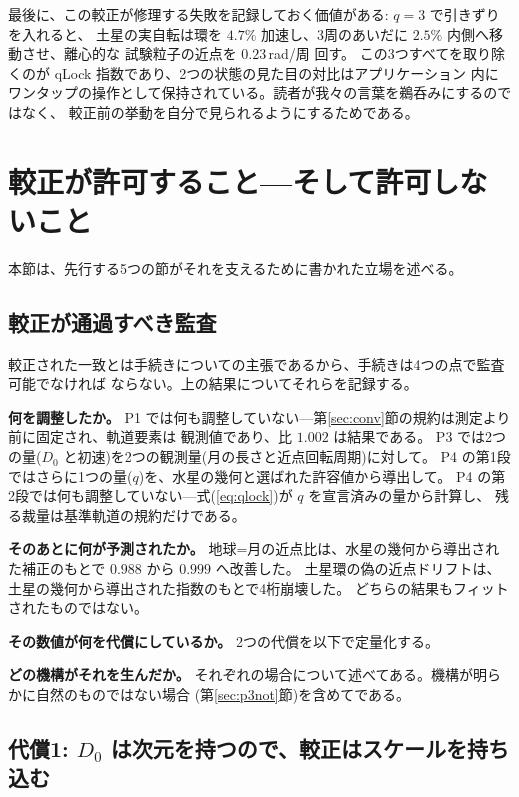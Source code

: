 \documentclass[a4paper,10pt,twocolumn]{ltjsarticle}
\begin{document}
最後に、この較正が修理する失敗を記録しておく価値がある: $q=3$ で引きずりを入れると、
土星の実自転は環を $4.7\%$ 加速し、3周のあいだに $2.5\%$ 内側へ移動させ、離心的な
試験粒子の近点を $0.23$\,rad/周 回す。
この3つすべてを取り除くのが qLock 指数であり、2つの状態の見た目の対比はアプリケーション
内にワンタップの操作として保持されている。読者が我々の言葉を鵜呑みにするのではなく、
較正前の挙動を自分で見られるようにするためである。

\section{較正が許可すること---そして許可しないこと}
\label{sec:license}

本節は、先行する5つの節がそれを支えるために書かれた立場を述べる。

\subsection{較正が通過すべき監査}
\label{sec:audit}

較正された一致とは手続きについての主張であるから、手続きは4つの点で監査可能でなければ
ならない。上の結果についてそれらを記録する。

\textbf{何を調整したか。}
P1 では何も調整していない---第\ref{sec:conv}節の規約は測定より前に固定され、軌道要素は
観測値であり、比 $1.002$ は結果である。
P3 では2つの量($D_0$ と初速)を2つの観測量(月の長さと近点回転周期)に対して。
P4 の第1段ではさらに1つの量($q$)を、水星の幾何と選ばれた許容値から導出して。
P4 の第2段では何も調整していない---式(\ref{eq:qlock})が $q$ を宣言済みの量から計算し、
残る裁量は基準軌道の規約だけである。

\textbf{そのあとに何が予測されたか。}
地球=月の近点比は、水星の幾何から導出された補正のもとで $0.988$ から $0.999$ へ改善した。
土星環の偽の近点ドリフトは、土星の幾何から導出された指数のもとで4桁崩壊した。
どちらの結果もフィットされたものではない。

\textbf{その数値が何を代償にしているか。}
2つの代償を以下で定量化する。

\textbf{どの機構がそれを生んだか。}
それぞれの場合について述べてある。機構が明らかに自然のものではない場合
(第\ref{sec:p3not}節)を含めてである。

\subsection{代償1: \texorpdfstring{$D_0$}{D0} は次元を持つので、較正はスケールを持ち込む}
\label{sec:cost1}
\end{document}
